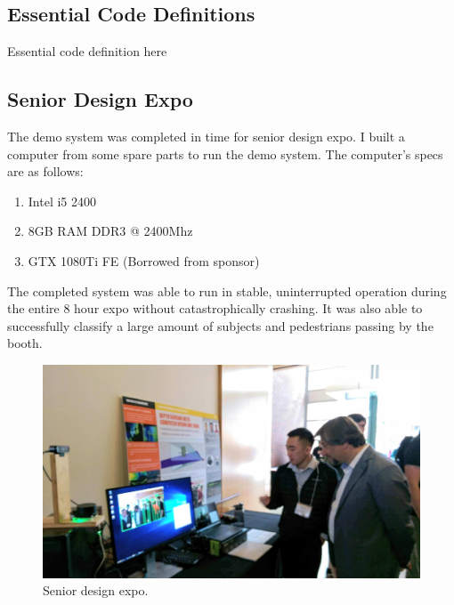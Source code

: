 \documentclass[onecolumn, draftclsnofoot,10pt, compsoc]{IEEEtran}
\makeatletter
\newcommand\captionof[1]{\def\@captype{#1}\caption}
\makeatother
\begin{document}
\begin{singlespace}
\subsection{Essential Code Definitions}
Essential code definition here

\subsection{Senior Design Expo}
	The demo system was completed in time for senior design expo. 
	I built a computer from some spare parts to run the demo system.
	The computer's specs are as follows:
	

	\begin{enumerate}
	\item Intel i5 2400
	\item 8GB RAM DDR3 @ 2400Mhz
	\item GTX 1080Ti FE (Borrowed from sponsor)
	\end{enumerate}
	

	The completed system was able to run in stable, uninterrupted operation during the entire 8 hour expo without catastrophically crashing. 
	It was also able to successfully classify a large amount of subjects and pedestrians passing by the booth.

	\begin{figure}[H]
	\includegraphics[scale=0.15]{expo1.jpg}
	\captionof{figure}{Senior design expo.}
	\label{expo1}
	\end{figure}


\end{singlespace}
\end{document}
